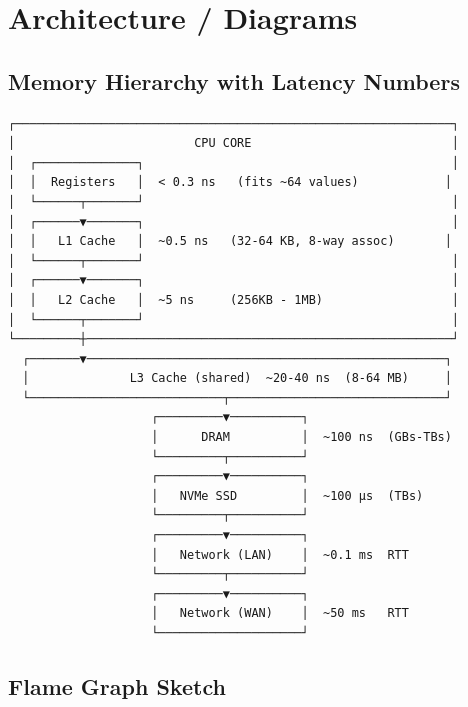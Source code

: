 \documentclass[11pt]{article}
\begin{document}
\section{Architecture / Diagrams}\label{architecture--diagrams}

\subsection{Memory Hierarchy with Latency Numbers}\label{memory-hierarchy-with-latency-numbers}

\setcodelang{}

\begin{verbatim}
┌─────────────────────────────────────────────────────────────┐
│                         CPU CORE                            │
│  ┌──────────────┐                                           │
│  │  Registers   │  < 0.3 ns   (fits ~64 values)            │
│  └──────┬───────┘                                           │
│  ┌──────▼───────┐                                           │
│  │   L1 Cache   │  ~0.5 ns   (32-64 KB, 8-way assoc)       │
│  └──────┬───────┘                                           │
│  ┌──────▼───────┐                                           │
│  │   L2 Cache   │  ~5 ns     (256KB - 1MB)                  │
│  └──────┬───────┘                                           │
└─────────┼───────────────────────────────────────────────────┘
  ┌───────▼──────────────────────────────────────────────────┐
  │              L3 Cache (shared)  ~20-40 ns  (8-64 MB)     │
  └───────────────────────────┬──────────────────────────────┘
                    ┌─────────▼──────────┐
                    │      DRAM          │  ~100 ns  (GBs-TBs)
                    └─────────┬──────────┘
                    ┌─────────▼──────────┐
                    │   NVMe SSD         │  ~100 µs  (TBs)
                    └─────────┬──────────┘
                    ┌─────────▼──────────┐
                    │   Network (LAN)    │  ~0.1 ms  RTT
                    └─────────┬──────────┘
                    ┌─────────▼──────────┐
                    │   Network (WAN)    │  ~50 ms   RTT
                    └────────────────────┘
\end{verbatim}

\subsection{Flame Graph Sketch}\label{flame-graph-sketch}

\end{document}
